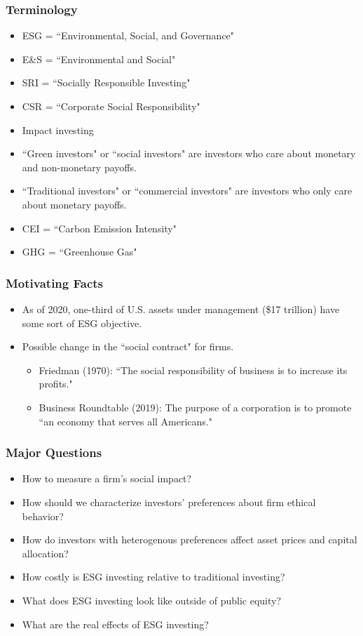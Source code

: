 \documentclass{beamer}
\begin{document}
\begin{frame}
\frametitle{Terminology}
\begin{itemize}
\item ESG = ``Environmental, Social, and Governance"
\item E\&S = ``Environmental and Social"
\item SRI = ``Socially Responsible Investing"
\item CSR = ``Corporate Social Responsibility"
\item Impact investing

\bigskip

\item ``Green investors" or ``social investors" are investors who care about monetary and non-monetary payoffs.
\item ``Traditional investors" or ``commercial investors" are investors who only care about monetary payoffs.

\bigskip

\item CEI = ``Carbon Emission Intensity"
\item GHG = ``Greenhouse Gas"
\end{itemize}
\end{frame}


\begin{frame}
\frametitle{Motivating Facts}
\begin{itemize}[<+->]
\item As of 2020, one-third of U.S. assets under management (\$17 trillion) have some sort of ESG objective.
\bigskip
\item Possible change in the ``social contract" for firms.
\begin{itemize}
\item Friedman (1970): ``The social responsibility of business is to increase its profits."
\item Business Roundtable (2019): The purpose of a corporation is to promote ``an economy that serves all Americans."
\end{itemize}
\end{itemize}
\end{frame}



\begin{frame}
\frametitle{Major Questions}
\begin{itemize}[<+->]
\item How to measure a firm's social impact?
\bigskip
\item How should we characterize investors' preferences about firm ethical behavior?
\bigskip
\item How do investors with heterogenous preferences affect asset prices and capital allocation?
\bigskip
\item How costly is ESG investing relative to traditional investing?
\bigskip
\item What does ESG investing look like outside of public equity?
\bigskip
\item What are the real effects of ESG investing?
\end{itemize}
\end{frame}
\end{document}
